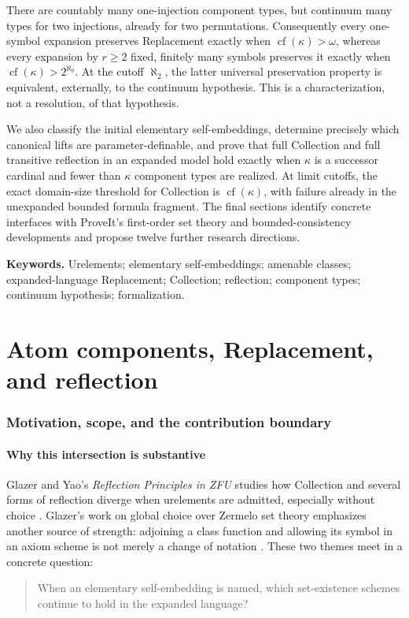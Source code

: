 \documentclass[11pt,letterpaper]{article}
\numberwithin{equation}{section}
\theoremstyle{plain}
\theoremstyle{definition}
\theoremstyle{remark}
\newcommand{\cf}{\operatorname{cf}}
\begin{document}
There are countably many one-injection component types, but continuum many types for two injections, already for two permutations. Consequently every one-symbol expansion preserves Replacement exactly when $\cf(\kappa)>\omega$, whereas every expansion by $r\geq2$ fixed, finitely many symbols preserves it exactly when $\cf(\kappa)>2^{\aleph_0}$. At the cutoff $\aleph_2$, the latter universal preservation property is equivalent, externally, to the continuum hypothesis. This is a characterization, not a resolution, of that hypothesis.

We also classify the initial elementary self-embeddings, determine precisely which canonical lifts are parameter-definable, and prove that full Collection and full transitive reflection in an expanded model hold exactly when $\kappa$ is a successor cardinal and fewer than $\kappa$ component types are realized. At limit cutoffs, the exact domain-size threshold for Collection is $\cf(\kappa)$, with failure already in the unexpanded bounded formula fragment. The final sections identify concrete interfaces with ProveIt's first-order set theory and bounded-consistency developments and propose twelve further research directions.

\vspace{0.15in}
\noindent\textbf{Keywords.} Urelements; elementary self-embeddings; amenable classes; expanded-language Replacement; Collection; reflection; component types; continuum hypothesis; formalization.

\clearpage
\begingroup
\fontsize{10}{11}\selectfont
\setlength{\parskip}{0pt}
\tableofcontents
\endgroup
\clearpage
{}

\part{Atom components, Replacement, and reflection}
\label{nee:part:one}

\section{Motivation, scope, and the contribution boundary}\label{nee:sec:intro}

\subsection{Why this intersection is substantive}
Glazer and Yao's \emph{Reflection Principles in ZFU} studies how Collection and several forms of reflection diverge when urelements are admitted, especially without choice \cite{GY2026}. Glazer's work on global choice over Zermelo set theory emphasizes another source of strength: adjoining a class function and allowing its symbol in an axiom scheme is not merely a change of notation \cite{G2024}. These two themes meet in a concrete question:
\begin{quote}
When an elementary self-embedding is named, which set-existence schemes continue to hold in the expanded language?
\end{quote}
\end{document}
